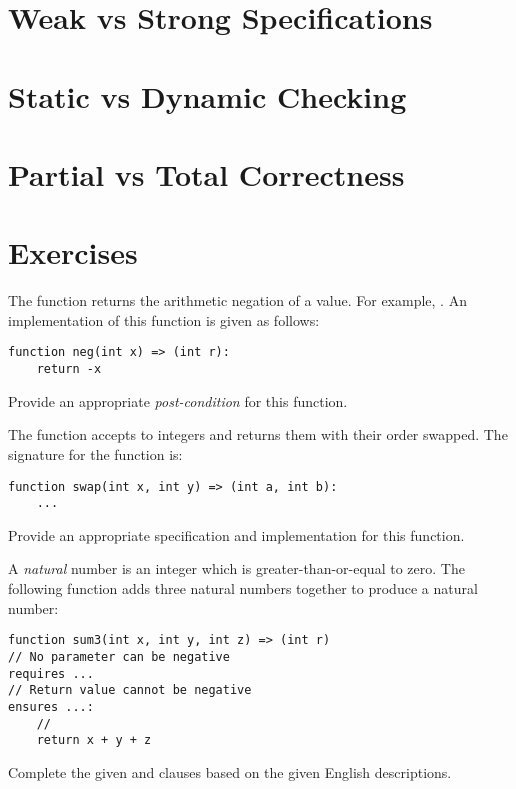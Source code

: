 \section{Weak vs Strong Specifications}
\section{Static vs Dynamic Checking}
\section{Partial vs Total Correctness}

\section{Exercises}

\begin{ex}
The function  returns the arithmetic negation of a value.
For example, .  An implementation of
this function is given as follows:
\begin{lstlisting}
function neg(int x) => (int r):
    return -x
\end{lstlisting}
Provide an appropriate {\em post-condition} for this function.
\end{ex}

\begin{ex}
The  function accepts to integers and returns them
with their order swapped.  The signature for the function is:
\begin{lstlisting}
function swap(int x, int y) => (int a, int b):
    ...
\end{lstlisting}
Provide an appropriate specification and implementation for this function.
\end{ex}

\begin{ex}

A {\em natural} number is an integer which is greater-than-or-equal to
zero.  The following function adds three natural numbers together to produce a natural number:
\begin{lstlisting}
function sum3(int x, int y, int z) => (int r)
// No parameter can be negative
requires ...
// Return value cannot be negative
ensures ...:
    //
    return x + y + z
\end{lstlisting}
Complete the given  and 
clauses based on the given English descriptions.

\end{ex}

